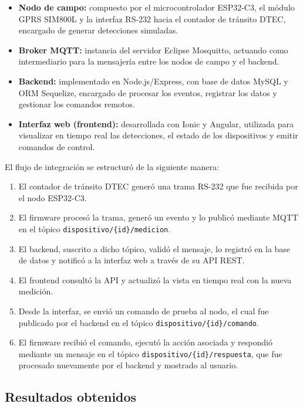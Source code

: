 \begin{itemize}
    \item \textbf{Nodo de campo:} compuesto por el microcontrolador ESP32-C3, el módulo GPRS SIM800L y la interfaz RS-232 hacia el contador de tránsito DTEC, encargado de generar detecciones simuladas.
    \item \textbf{Broker MQTT:} instancia del servidor Eclipse Mosquitto, actuando como intermediario para la mensajería entre los nodos de campo y el backend.
    \item \textbf{Backend:} implementado en Node.js/Express, con base de datos MySQL y ORM Sequelize, encargado de procesar los eventos, registrar los datos y gestionar los comandos remotos.
    \item \textbf{Interfaz web (frontend):} desarrollada con Ionic y Angular, utilizada para visualizar en tiempo real las detecciones, el estado de los dispositivos y emitir comandos de control.
\end{itemize}

El flujo de integración se estructuró de la siguiente manera:

\begin{enumerate}
    \item El contador de tránsito DTEC generó una trama RS-232 que fue recibida por el nodo ESP32-C3.
    \item El firmware procesó la trama, generó un evento y lo publicó mediante MQTT en el tópico \texttt{dispositivo/\{id\}/medicion}.
    \item El backend, suscrito a dicho tópico, validó el mensaje, lo registró en la base de datos y notificó a la interfaz web a través de su API REST.
    \item El frontend consultó la API y actualizó la vista en tiempo real con la nueva medición.
    \item Desde la interfaz, se envió un comando de prueba al nodo, el cual fue publicado por el backend en el tópico \texttt{dispositivo/\{id\}/comando}.
    \item El firmware recibió el comando, ejecutó la acción asociada y respondió mediante un mensaje en el tópico \texttt{dispositivo/\{id\}/respuesta}, que fue procesado nuevamente por el backend y mostrado al usuario.
\end{enumerate}

\subsection{Resultados obtenidos}

